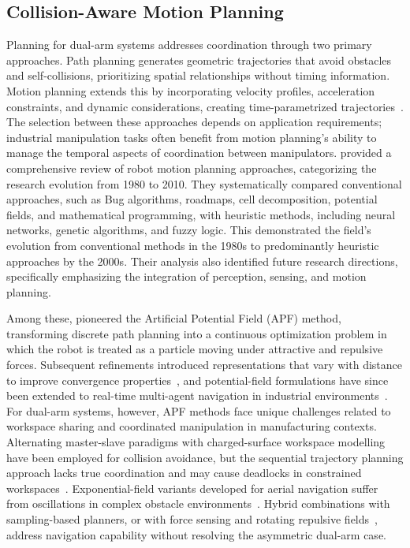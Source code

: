 \subsection{Collision-Aware Motion Planning}\label{subsec:intro_iapf}
Planning for dual-arm systems addresses coordination through two primary approaches. Path planning generates geometric trajectories that avoid obstacles and self-collisions, prioritizing spatial relationships without timing information. Motion planning extends this by incorporating velocity profiles, acceleration constraints, and dynamic considerations, creating time-parametrized trajectories~\citep{abbas2023systematic}. The selection between these approaches depends on application requirements; industrial manipulation tasks often benefit from motion planning's ability to manage the temporal aspects of coordination between manipulators. \citet{tang2012review} provided a comprehensive review of robot motion planning approaches, categorizing the research evolution from 1980 to 2010. They systematically compared conventional approaches, such as Bug algorithms, roadmaps, cell decomposition, potential fields, and mathematical programming, with heuristic methods, including neural networks, genetic algorithms, and fuzzy logic. This demonstrated the field's evolution from conventional methods in the 1980s to predominantly heuristic approaches by the 2000s. Their analysis also identified future research directions, specifically emphasizing the integration of perception, sensing, and motion planning.

Among these, \citet{khatib1986real} pioneered the Artificial Potential Field (APF) method,
transforming discrete path planning into a continuous optimization problem in which the robot is
treated as a particle moving under attractive and repulsive forces. Subsequent refinements
introduced representations that vary with distance to improve convergence
properties~\citep{volpe1987artificial}, and potential-field formulations have since been extended to
real-time multi-agent navigation in industrial environments~\citep{prajapati2026mppf}. For dual-arm
systems, however, APF methods face unique challenges related to workspace sharing and coordinated
manipulation in manufacturing contexts. Alternating master-slave paradigms with charged-surface
workspace modelling have been employed for collision avoidance, but the sequential trajectory
planning approach lacks true coordination and may cause deadlocks in constrained
workspaces~\citep{chuang2006priority}. Exponential-field variants developed for aerial navigation
suffer from oscillations in complex obstacle environments~\citep{jayaweera2020dapf}. Hybrid
combinations with sampling-based planners, or with force sensing and rotating repulsive
fields~\citep{lin2025rotating}, address navigation capability without resolving the asymmetric
dual-arm case.

